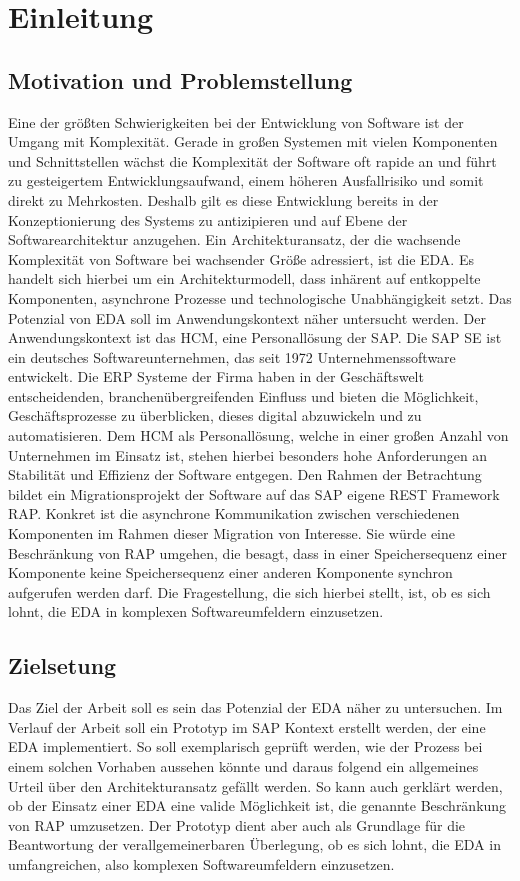 \section{Einleitung}
\subsection{Motivation und Problemstellung}
Eine der größten Schwierigkeiten bei der Entwicklung von Software ist der Umgang mit Komplexität. Gerade in großen Systemen mit vielen Komponenten und Schnittstellen wächst die Komplexität der Software oft rapide an und führt zu gesteigertem Entwicklungsaufwand, einem höheren Ausfallrisiko und somit direkt zu Mehrkosten. Deshalb gilt es diese Entwicklung bereits in der Konzeptionierung des Systems zu antizipieren und auf Ebene der Softwarearchitektur anzugehen. Ein Architekturansatz, der die wachsende Komplexität von Software bei wachsender Größe adressiert, ist die EDA. Es handelt sich hierbei um ein Architekturmodell, dass inhärent auf entkoppelte Komponenten, asynchrone Prozesse und technologische Unabhängigkeit setzt. Das Potenzial von EDA soll im Anwendungskontext näher untersucht werden. Der Anwendungskontext ist das HCM, eine Personallösung der SAP. Die SAP SE ist ein deutsches Softwareunternehmen, das seit 1972 Unternehmenssoftware entwickelt. Die \ac{ERP} Systeme der Firma haben in der Geschäftswelt entscheidenden, branchenübergreifenden Einfluss und bieten die Möglichkeit, Geschäftsprozesse zu überblicken, dieses digital abzuwickeln und zu automatisieren. \cite[Vgl.][]{sapse_was} Dem HCM als Personallösung, welche in einer großen Anzahl von Unternehmen im Einsatz ist, stehen hierbei besonders hohe Anforderungen an Stabilität und Effizienz der Software entgegen.
Den Rahmen der Betrachtung bildet ein Migrationsprojekt der Software auf das SAP eigene REST Framework RAP. Konkret ist die asynchrone Kommunikation zwischen verschiedenen Komponenten im Rahmen dieser Migration von Interesse. Sie würde eine Beschränkung von RAP umgehen, die besagt, dass in einer Speichersequenz einer Komponente keine Speichersequenz einer anderen Komponente synchron aufgerufen werden darf. Die Fragestellung, die sich hierbei stellt, ist, ob es sich lohnt, die \ac{EDA} in komplexen Softwareumfeldern einzusetzen.

\subsection{Zielsetung}
Das Ziel der Arbeit soll es sein das Potenzial der \acl{EDA} näher zu untersuchen. Im Verlauf der Arbeit soll ein Prototyp im SAP Kontext erstellt werden, der eine \ac{EDA} implementiert. So soll exemplarisch geprüft werden, wie der Prozess bei einem solchen Vorhaben aussehen könnte und daraus folgend ein allgemeines Urteil über den Architekturansatz gefällt werden. So kann auch gerklärt werden, ob der Einsatz einer EDA eine valide Möglichkeit ist, die genannte Beschränkung von RAP umzusetzen. Der Prototyp dient aber auch als Grundlage für die Beantwortung der verallgemeinerbaren Überlegung, ob es sich lohnt, die \ac{EDA} in umfangreichen, also komplexen Softwareumfeldern einzusetzen.

